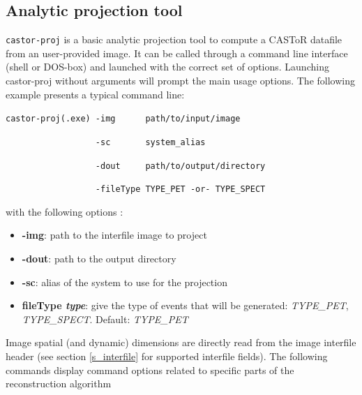 \documentclass[a4paper, 11pt]{article}
\begin{document}

\ifdefined\dev
\subsection{Analytic projection tool}
\label{ss_utilities_cproj}

\verb|castor-proj| is a basic analytic projection tool to compute a CASToR datafile from an user-provided image. It can be called through a
command line interface (shell or DOS-box) and launched with the correct set of options. Launching castor-proj without arguments will prompt
the main usage options. The following example presents a typical command line:

\bigskip
\verb|castor-proj(.exe) -img      path/to/input/image| 

\verb|                  -sc       system_alias| 

\verb|                  -dout     path/to/output/directory| 

  \verb|                  -fileType TYPE_PET -or- TYPE_SPECT| 
\bigskip

with the following options :

\begin{itemize}
  \item \textbf{-img}: path to the interfile image to project
  \item \textbf{-dout}: path to the output directory
  \item \textbf{-sc}: alias of the system to use for the projection
  \item \textbf{fileType \textit{type}}: give the type of events that will be generated: \textit{TYPE\_PET}, \textit{TYPE\_SPECT}.
        Default: \textit{TYPE\_PET}
\end{itemize}
\bigskip

Image spatial (and dynamic) dimensions are directly read from the image interfile header (see section \ref{s_interfile} for supported interfile fields).
The following commands display command options related to specific parts of the reconstruction algorithm 
 
\end{document}
